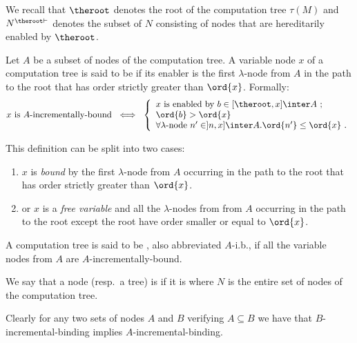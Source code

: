 We recall that $\theroot$ denotes the root of the computation tree
$\tau(M)$ and $N^{\theroot\vdash}$ denotes the subset of $N$
consisting of nodes that are hereditarily enabled by $\theroot$.



\begin{definition}
Let $A$ be a subset of nodes of the computation tree. A variable
node $x$ of a computation tree is said to be
 if its enabler is the first
$\lambda$-node from $A$ in the path to the root that has order
strictly greater than $\ord{x}$. Formally:
\begin{align*}
x \mbox{ is $A$-incrementally-bound} \  \iff \  \left\{
                                                  \begin{array}{ll}
                                                    x \hbox{ is enabled by } b \in [\theroot,x]\inter A \ ; \\
                                                    \ord{b} > \ord{x} \;\\
                                                    \forall \lambda\mbox{-node } n' \in ]n,x]\inter A  . \ord{n'} \leq \ord{x} \ .
                                                  \end{array}
                                                \right.
\end{align*}

This definition can be split into two cases:
\begin{enumerate}
\item $x$ is \emph{bound} by the first $\lambda$-node from $A$ occurring in the path to the root that has
order strictly greater than $\ord{x}$.
\item or $x$ is a \emph{free variable} and all the $\lambda$-nodes from from $A$ occurring in the path to the root except the root have order
 smaller or equal to $\ord{x}$.
\end{enumerate}

A computation tree is said to be ,
also abbreviated $A$-i.b., if all the variable nodes from $A$ are
$A$-incrementally-bound.

We say that a node (resp.\ a tree) is
 if it is
 where $N$ is the entire set of nodes of the computation tree.
\end{definition}

Clearly for any two sets of nodes $A$ and $B$ verifying $A\subseteq
B$ we have that $B$-incremental-binding implies
$A$-incremental-binding.


